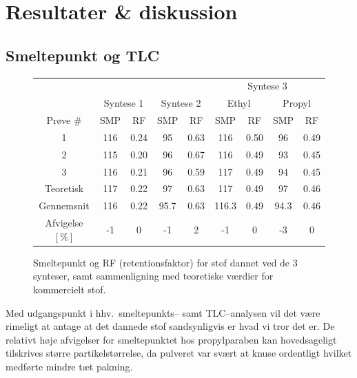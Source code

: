 \section{Resultater \& diskussion}

    \subsection{Smeltepunkt og TLC}
    \begin{figure}[H]\centering
        \caption{Smeltepunkt og RF (retentionsfaktor) for stof dannet ved de 3 synteser, samt sammenligning med teoretiske værdier for kommercielt stof.}
        \begin{tabular*}{\linewidth}{c@{\extracolsep{\fill}}cccccccc}
            \toprule
            & & & & & \multicolumn{4}{c}{Syntese 3} \\
            \cmidrule(r){6-9}
            & \multicolumn{2}{c}{Syntese 1} & \multicolumn{2}{c}{Syntese 2} & \multicolumn{2}{c}{Ethyl} & \multicolumn{2}{c}{Propyl} \\
            \cmidrule(r){2-3} \cmidrule(r){4-5} \cmidrule(r){6-7} \cmidrule(r){8-9}
            Prøve \# & SMP & RF & SMP & RF & SMP & RF & SMP & RF \\
            \midrule
            1 & 116 & 0.24 & 95 & 0.63 & 116 & 0.50 & 96 & 0.49 \\
            2 & 115 & 0.20 & 96 & 0.67 & 116 & 0.49 & 93 & 0.45 \\
            3 & 116 & 0.21 & 96 & 0.59 & 117 & 0.49 & 94 & 0.45 \\
            \midrule
            Teoretisk & 117 & 0.22 & 97 & 0.63 & 117 & 0.49 & 97 & 0.46 \\
            Gennemsnit & 116 & 0.22 & 95.7 & 0.63 & 116.3 & 0.49 & 94.3 & 0.46 \\
            \midrule
            Afvigelse $\left[\si{\%}\right]$ & -1 & 0 & -1 & 2 & -1 & 0 & -3 & 0 \\
            \bottomrule
        \end{tabular*}
    \end{figure} \vskip -8pt
    Med udgangspunkt i hhv.\ smeltepunkts-- samt TLC--analysen vil det være rimeligt at antage at det dannede stof sandsynligvis er hvad vi tror det er. De relativt høje afvigelser for smeltepunktet hos propylparaben kan hovedsageligt tilskrives større partikelstørrelse, da pulveret var svært at knuse ordentligt hvilket medførte mindre tæt pakning.

